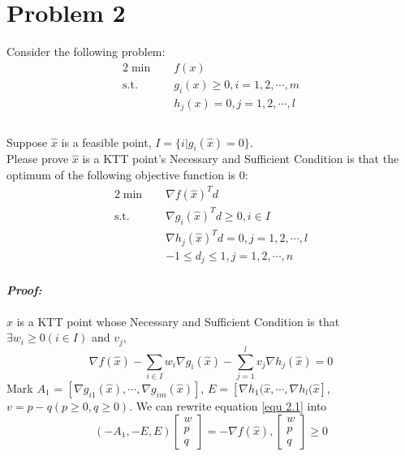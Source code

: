 \documentclass[paper=a4, fontsize=11pt]{scrartcl} %
\numberwithin{equation}{section} %
\numberwithin{figure}{section} %
\numberwithin{table}{section} %
\begin{document}
\section{Problem 2}
Consider the following problem:
\begin{alignat}{2}          \nonumber
\min\quad & f(x) \\    \nonumber
\mbox{s.t.}\quad            \nonumber
& g_i(x) \geq 0, i=1,2,\cdots,m \\    \nonumber
& h_j(x) =0, j=1,2,\cdots,l\\     \nonumber
\end{alignat}\\
Suppose $\hat{x}$ is a feasible point, $I=\{i|g_i(\hat{x})=0\}$.\\
Please prove $\hat{x}$ is a KTT point's Necessary and Sufficient Condition is that the optimum of the following objective function is 0:
\begin{alignat}{2}          \nonumber
\min\quad & \nabla f(\hat{x})^Td \\    \nonumber
\mbox{s.t.}\quad            \nonumber
& \nabla g_i(\hat{x})^Td \geq0, i\in I \\    \nonumber
& \nabla h_j(\hat{x})^Td =0, j=1,2,\cdots,l\\ \nonumber
& -1 \leq d_j \leq 1, j =1,2,\cdots,n
\end{alignat}\\
\emph{\textbf{Proof:}}\\~\\
$\hat{x}$ is a KTT point whose Necessary and Sufficient Condition is that $\exists w_i\geq0(i\in I)$ and $v_j$,
\begin{equation} \label{equ 2.1}
\nabla f(\hat{x}) - \sum_{i\in I}w_i\nabla g_i(\hat{x})-\sum_{j=1}^{l}v_j\nabla h_j(\hat{x}) = 0
\end{equation}
Mark $A_1$ = $\left[\nabla g_{i1}(\hat{x}),\cdots,\nabla g_{im}(\hat{x})\right]$, $E=\left[\nabla h_1(\hat{x},\cdots,\nabla h_l(\hat{x}\right]$, $v = p-q(p\geq0,q\geq0)$. We can rewrite equation \ref{equ 2.1} into
\begin{equation} \label{equ 2.2}
(-A_1, -E, E)\begin{bmatrix}w\\p\\q\end{bmatrix}=-\nabla f(\hat{x}), \begin{bmatrix}w\\p\\q\end{bmatrix}\geq 0
\end{equation}
\end{document}
